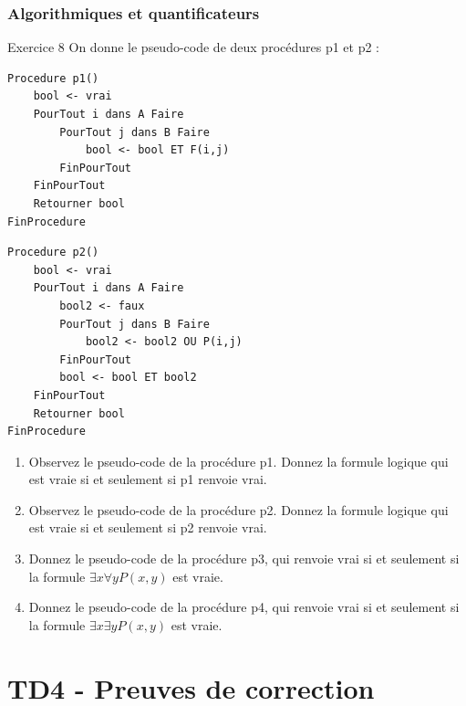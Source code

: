 \documentclass[a4paper,11pt]{article}
\begin{document}
\section{Algorithmiques et quantificateurs}

\begin{exercisebox}{Exercice 8}
On donne le pseudo-code de deux procédures p1 et p2 :

\begin{minipage}{0.45\textwidth}
\begin{lstlisting}
Procedure p1()
    bool <- vrai
    PourTout i dans A Faire
        PourTout j dans B Faire
            bool <- bool ET F(i,j)
        FinPourTout
    FinPourTout
    Retourner bool
FinProcedure
\end{lstlisting}
\end{minipage}
\hfill
\begin{minipage}{0.45\textwidth}
\begin{lstlisting}
Procedure p2()
    bool <- vrai
    PourTout i dans A Faire
        bool2 <- faux
        PourTout j dans B Faire
            bool2 <- bool2 OU P(i,j)
        FinPourTout
        bool <- bool ET bool2
    FinPourTout
    Retourner bool
FinProcedure
\end{lstlisting}
\end{minipage}

\begin{enumerate}
    \item Observez le pseudo-code de la procédure p1. Donnez la formule logique qui est vraie si et seulement si p1 renvoie vrai.
    \item Observez le pseudo-code de la procédure p2. Donnez la formule logique qui est vraie si et seulement si p2 renvoie vrai.
    \item Donnez le pseudo-code de la procédure p3, qui renvoie vrai si et seulement si la formule $\exists x\forall yP(x, y)$ est vraie.
    \item Donnez le pseudo-code de la procédure p4, qui renvoie vrai si et seulement si la formule $\exists x\exists yP(x, y)$ est vraie.
\end{enumerate}
\end{exercisebox}

\newpage


\part{TD4 - Preuves de correction}
\end{document}
